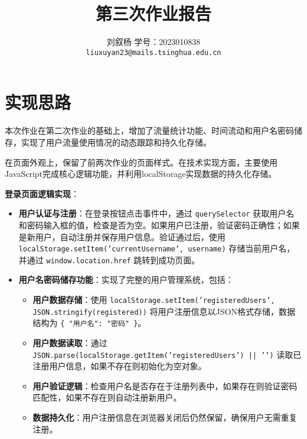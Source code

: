 \documentclass[UTF8]{ctexart}
\title{第三次作业报告}
\author{刘叙杨 \quad 学号：2023010838\\ \texttt{liuxuyan23@mails.tsinghua.edu.cn}}
\date{}
\begin{document}
\maketitle

\section{实现思路}

本次作业在第二次作业的基础上，增加了流量统计功能、时间流动和用户名密码储存，实现了用户流量使用情况的动态跟踪和持久化存储。

在页面外观上，保留了前两次作业的页面样式。在技术实现方面，主要使用JavaScript完成核心逻辑功能，并利用localStorage实现数据的持久化存储。

\textbf{登录页面逻辑实现}：
\begin{itemize}
    
    \item \textbf{用户认证与注册}：在登录按钮点击事件中，通过 \texttt{querySelector} 获取用户名和密码输入框的值，检查是否为空。如果用户已注册，验证密码正确性；如果是新用户，自动注册并保存用户信息。验证通过后，使用 \texttt{localStorage.setItem('currentUsername', username)} 存储当前用户名，并通过 \texttt{window.location.href} 跳转到成功页面。
    
    \item \textbf{用户名密码储存功能}：实现了完整的用户管理系统，包括：
    \begin{itemize}
        \item \textbf{用户数据存储}：使用 \texttt{localStorage.setItem('registeredUsers', JSON.stringify(registered))} 将用户注册信息以JSON格式存储，数据结构为 \texttt{\{ "用户名": "密码" \}}。
        \item \textbf{用户数据读取}：通过 \texttt{JSON.parse(localStorage.getItem('registeredUsers') || '{}')} 读取已注册用户信息，如果不存在则初始化为空对象。
        \item \textbf{用户验证逻辑}：检查用户名是否存在于注册列表中，如果存在则验证密码匹配性，如果不存在则自动注册新用户。
        \item \textbf{数据持久化}：用户注册信息在浏览器关闭后仍然保留，确保用户无需重复注册。
    \end{itemize}
    
\end{itemize}
\end{document}
